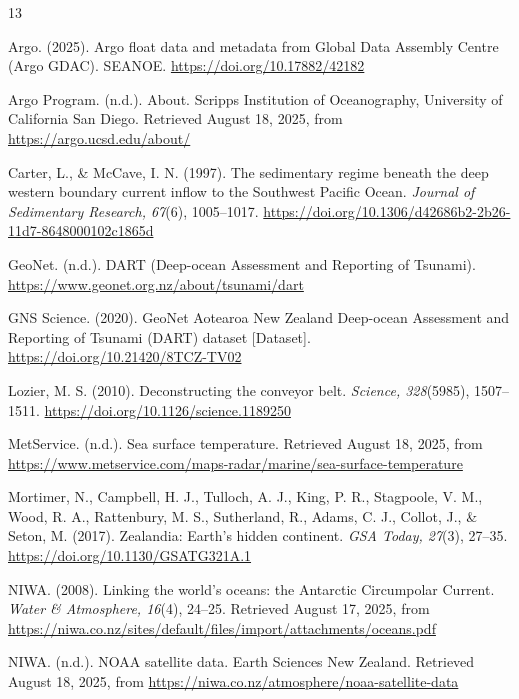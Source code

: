 \documentclass[12pt,a4paper]{article}
\begin{document}
{
\begin{thebibliography}{13}

Argo. (2025). Argo float data and metadata from Global Data Assembly Centre
(Argo GDAC). SEANOE. \url{https://doi.org/10.17882/42182}

Argo Program. (n.d.). About. Scripps Institution of Oceanography, University
of California San Diego. Retrieved August 18, 2025, from
\url{https://argo.ucsd.edu/about/}

Carter, L., \& McCave, I. N. (1997). The sedimentary regime beneath the deep
western boundary current inflow to the Southwest Pacific Ocean.
\emph{Journal of Sedimentary Research, 67}(6), 1005--1017.
\url{https://doi.org/10.1306/d42686b2-2b26-11d7-8648000102c1865d}

GeoNet. (n.d.). DART (Deep-ocean Assessment and Reporting of Tsunami).
\url{https://www.geonet.org.nz/about/tsunami/dart}

GNS Science. (2020). GeoNet Aotearoa New Zealand Deep-ocean Assessment and
Reporting of Tsunami (DART) dataset [Dataset].
\url{https://doi.org/10.21420/8TCZ-TV02}

Lozier, M. S. (2010). Deconstructing the conveyor belt. \emph{Science, 328}(5985),
1507--1511. \url{https://doi.org/10.1126/science.1189250}

MetService. (n.d.). Sea surface temperature. Retrieved August 18, 2025, from
\url{https://www.metservice.com/maps-radar/marine/sea-surface-temperature}

Mortimer, N., Campbell, H. J., Tulloch, A. J., King, P. R., Stagpoole,
V. M., Wood, R. A., Rattenbury, M. S., Sutherland, R., Adams, C. J., Collot,
J., \& Seton, M. (2017). Zealandia: Earth's hidden continent. \emph{GSA Today,
27}(3), 27--35. \url{https://doi.org/10.1130/GSATG321A.1}

NIWA. (2008). Linking the world's oceans: the Antarctic Circumpolar Current.
\emph{Water \& Atmosphere, 16}(4), 24--25. Retrieved August 17, 2025, from
\url{https://niwa.co.nz/sites/default/files/import/attachments/oceans.pdf}

NIWA. (n.d.). NOAA satellite data. Earth Sciences New Zealand. Retrieved
August 18, 2025, from \url{https://niwa.co.nz/atmosphere/noaa-satellite-data}


\end{thebibliography}}
\end{document}

